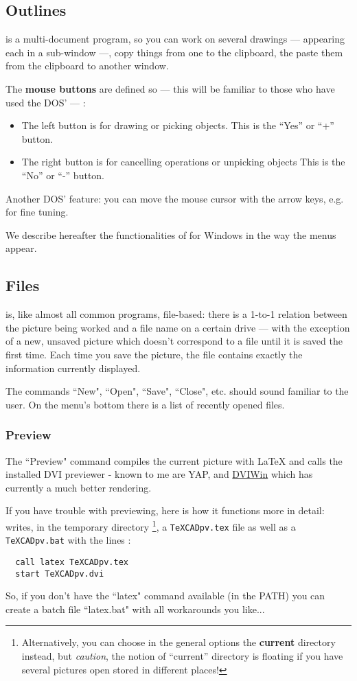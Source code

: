 \documentclass[11pt,a4paper]{article}
\begin{document}
\subsection{Outlines}
{\TC} is a multi-document program, so you can work on several
drawings --- appearing each in a sub-window ---, copy things from
one to the clipboard, the paste them from the clipboard to another
window.

The {\bf mouse buttons} are defined so --- this will be familiar to those who have used the DOS' {\TC} --- :
\begin{itemize}
\item The left button is for drawing or picking objects.
This is the ``Yes'' or ``+'' button.
\item The right button is for cancelling operations or unpicking objects
This is the ``No'' or ``-'' button.
\end{itemize}

Another DOS' {\TC} feature: you can move the mouse cursor with the arrow keys, e.g. for fine tuning.

We describe hereafter the functionalities of {\TC} for Windows in the
way the menus appear.
%
\subsection{Files}
{\TC} is, like almost all common programs, file-based: there is
a 1-to-1 relation between the picture being worked and a file name
on a certain drive --- with the exception of a new, unsaved
picture which doesn't correspond to a file until it is saved the first
time. Each time you save the picture, the file contains exactly
the information currently displayed.

The commands ``New", ``Open", ``Save", ``Close", etc. should sound
familiar to the user. On the menu's bottom there is a list of recently
opened files.

\subsubsection{Preview}
The ``Preview" command compiles the current picture with LaTeX and
calls the installed DVI previewer - known to me are YAP, and
\href{http://dviwin.keystone.gr/}{DVIWin}
which has currently a much better rendering.

If you have trouble with previewing, here is how it
functions more in detail: {\TC} writes,
in the temporary directory \footnote{Alternatively, you can choose in
the general options the {\bf current} directory instead, but {\it caution}, the
notion of ``current'' directory is floating if you have several pictures
open stored in different places!},
a {\tt TeXCADpv.tex} file
as well as a {\tt TeXCADpv.bat} with the lines :
\begin{verbatim}
  call latex TeXCADpv.tex
  start TeXCADpv.dvi
\end{verbatim}
So, if you don't have the ``latex" command available (in the PATH) you
can create a batch file ``latex.bat" with all workarounds you like...
\end{document}
